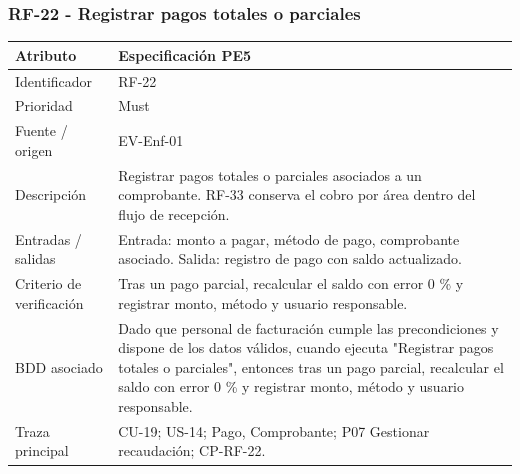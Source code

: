 \documentclass[11pt,a4paper]{article}
\begin{document}
	\subsubsection{RF-22 - Registrar pagos totales o parciales}
	\begin{tabularx}{\textwidth}{p{3.2cm}Y}
		\toprule
		\textbf{Atributo} & \textbf{Especificación PE5}\\\midrule
		Identificador & RF-22\\
		Prioridad & Must\\
		Fuente / origen & EV-Enf-01\\
		Descripción & Registrar pagos totales o parciales asociados a un comprobante. RF-33 conserva el cobro por área dentro del flujo de recepción.\\
		Entradas / salidas & Entrada: monto a pagar, método de pago, comprobante asociado. Salida: registro de pago con saldo actualizado.\\
		Criterio de verificación & Tras un pago parcial, recalcular el saldo con error 0 \% y registrar monto, método y usuario responsable.\\
		BDD asociado & Dado que personal de facturación cumple las precondiciones y dispone de los datos válidos, cuando ejecuta "Registrar pagos totales o parciales", entonces tras un pago parcial, recalcular el saldo con error 0 \% y registrar monto, método y usuario responsable.\\
		Traza principal & CU-19; US-14; Pago, Comprobante; P07 Gestionar recaudación; CP-RF-22.\\
		\bottomrule
	\end{tabularx}
	\clearpage
\end{document}
